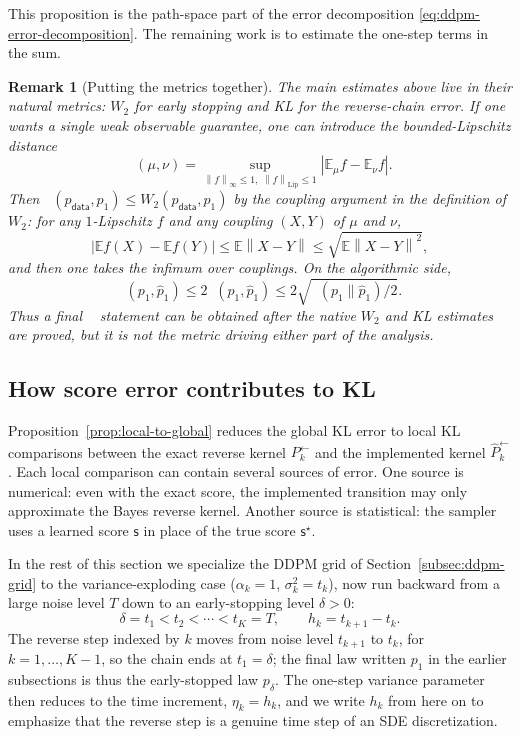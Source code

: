 \documentclass[10pt,a4paper]{amsart}
\numberwithin{equation}{section}
\newtheorem*{remark}{Remark}
\DeclareMathOperator{\KL}{D_{\mathsf{KL}}}
\DeclareMathOperator{\TV}{D_{\mathsf{TV}}}
\DeclareMathOperator{\BL}{D_{\mathsf{BL}}}
\newcommand{\E}{\mathbb{E}}
\newcommand{\wh}[1]{\widehat{#1}}
\newcommand{\norm}[1]{\left\lVert #1 \right\rVert}
\newcommand{\abs}[1]{\left\lvert #1 \right\rvert}
\newcommand{\pdata}{p_{\mathsf{data}}}
\newcommand{\sstar}{\mathsf{s}^{\star}}
\newcommand{\score}{\mathsf{s}}
\begin{document}
This proposition is the path-space part of the error decomposition
\eqref{eq:ddpm-error-decomposition}.  The remaining work is to estimate
the one-step terms in the sum.

\begin{remark}[Putting the metrics together]\label{rem:combine-metrics}
The main estimates above live in their natural metrics: $W_2$ for early
stopping and KL for the reverse-chain error.  If one wants a single weak
observable guarantee, one can introduce the bounded-Lipschitz distance
\[
    \BL(\mu,\nu)
    =
    \sup_{\norm f_\infty\leq1,\;\norm f_{\mathrm{Lip}}\leq1}
    \abs{\E_\mu f-\E_\nu f}.
\]
Then $\BL(\pdata,p_1)\leq W_2(\pdata,p_1)$ by the coupling argument in the
definition of $W_2$: for any $1$-Lipschitz $f$ and any coupling $(X,Y)$ of
$\mu$ and $\nu$,
\[
    \abs{\E f(X)-\E f(Y)}\leq \E\norm{X-Y}
    \leq \sqrt{\E\norm{X-Y}^2},
\]
and then one takes the infimum over couplings.  On the algorithmic side,
\[
    \BL(p_1,\wh p_1)\leq 2\TV(p_1,\wh p_1)
    \leq 2\sqrt{\KL(p_1\|\wh p_1)/2}.
\]
Thus a final $\BL$ statement can be obtained after the native $W_2$ and KL
estimates are proved, but it is not the metric driving either part of the
analysis.
\end{remark}

\subsection{How score error contributes to KL}

Proposition~\ref{prop:local-to-global} reduces the global KL error to
local KL comparisons between the exact reverse kernel $P_k^{\leftarrow}$ and the
implemented kernel $\wh P_k^{\leftarrow}$.  Each local comparison can contain several
sources of error.  One source is numerical: even with the exact score, the
implemented transition may only approximate the Bayes reverse kernel.  Another
source is statistical: the sampler uses a learned score $\score$ in place of
the true score $\sstar$.

In the rest of this section we specialize the DDPM grid of
Section~\ref{subsec:ddpm-grid} to the variance-exploding case
($\alpha_k=1$, $\sigma_k^2=t_k$), now run backward from a large noise level $T$
down to an early-stopping level $\delta>0$:
\[
    \delta=t_1<t_2<\cdots<t_K=T,\qquad h_k=t_{k+1}-t_k.
\]
The reverse step indexed by $k$ moves from noise level $t_{k+1}$ to $t_k$, for
$k=1,\ldots,K-1$, so the chain ends at $t_1=\delta$; the final law written $p_1$
in the earlier subsections is thus the early-stopped law $p_\delta$.  The one-step variance
parameter then reduces to the time increment, $\eta_k=h_k$, and we write $h_k$
from here on to emphasize that the reverse step is a genuine time step of an SDE
discretization.
\end{document}
